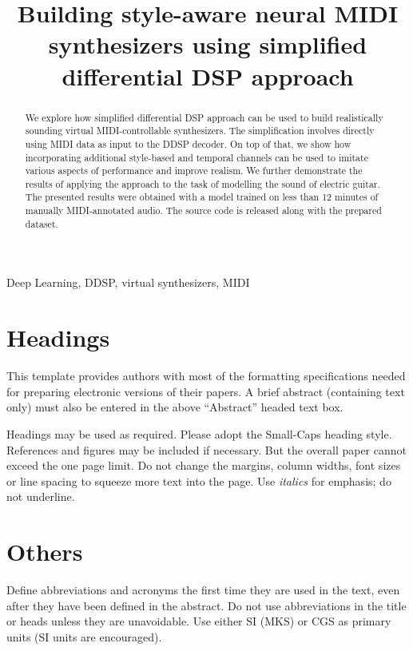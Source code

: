 \documentclass{article}
\title{Building style-aware neural MIDI synthesizers using simplified differential DSP approach}
\begin{document}
\tenpt
\maketitle

\begin{sloppy}
\begin{abstract}
We explore how simplified differential DSP approach can be used to build realistically sounding virtual MIDI-controllable synthesizers. The simplification involves directly using  MIDI data as input to the DDSP decoder. On top of that, we show how  incorporating additional style-based and temporal channels can be used to imitate various aspects of performance and improve realism.  We further demonstrate the results of applying the approach to the task of modelling the sound of electric guitar. The presented results were obtained with a model trained on less than 12 minutes of manually MIDI-annotated audio. The source code is released along with the prepared dataset.
\end{abstract}

\begin{keywords}
Deep Learning, DDSP, virtual synthesizers, MIDI
\end{keywords}

\section{Headings}
\label{sec:headings}
This template provides authors with most of the formatting specifications needed for preparing electronic versions of their papers. A brief abstract (containing text only) must also be entered in the above ``Abstract'' headed text box.

Headings may be used as required. Please adopt the Small-Caps heading style. References and figures may be included if necessary. But the overall paper cannot exceed the one page limit. Do not change the margins, column widths, font sizes or line spacing to squeeze more text into the page. Use \textit{italics} for emphasis; do not underline. 

\section{Others}
\label{sec:others}
Define abbreviations and acronyms the first time they are used in the text, even after they have been defined in the abstract. Do not use abbreviations in the title or heads unless they are unavoidable. Use either SI (MKS) or CGS as primary units (SI units are encouraged).


\end{sloppy}
\end{document}
